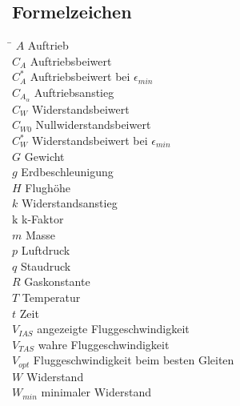 \subsection*{Formelzeichen}
\begin{tabbing}
\hspace*{2cm}\=\kill
$A$ \> Auftrieb \\[0.2ex]
$C_A$ \> Auftriebsbeiwert \\[0.2ex]
$C_A^*$ \> Auftriebsbeiwert bei $\epsilon_{min}$ \\[0.2ex]
$C_{A_{\alpha}}$ \> Auftriebsanstieg \\[0.2ex]
$C_W$ \> Widerstandsbeiwert \\[0.2ex]
$C_{W0}$ \> Nullwiderstandsbeiwert \\[0.2ex]
$C_W^*$ \> Widerstandsbeiwert bei $\epsilon_{min}$ \\[0.2ex]
$G$ \> Gewicht \\[0.2ex]
$g$ \> Erdbeschleunigung \\[0.2ex]
$H$ \> Flughöhe \\[0.2ex]
$k$ \> Widerstandsanstieg \\[0.2ex]
$\mathrm{k}$ \> k-Faktor \\[0.2ex]
$m$ \> Masse \\[0.2ex]
$p$ \> Luftdruck \\[0.2ex]
$q$ \> Staudruck \\[0.2ex]
$R$ \> Gaskonstante \\[0.2ex]
$T$ \> Temperatur \\[0.2ex]
$t$ \> Zeit \\[0.2ex]
$V_{IAS}$ \> angezeigte Fluggeschwindigkeit \\[0.2ex]
$V_{TAS}$ \> wahre Fluggeschwindigkeit \\[0.2ex]
$V_{opt}$ \> Fluggeschwindigkeit beim besten Gleiten \\[0.2ex]
$W$ \> Widerstand \\[0.2ex]
$W_{min}$ \> minimaler Widerstand \\[0.2ex]
\end{tabbing}

